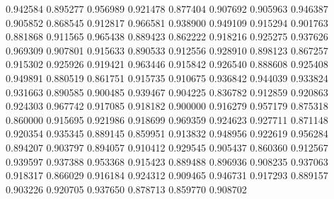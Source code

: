 0.942584
0.895277
0.956989
0.921478
0.877404
0.907692
0.905963
0.946387
0.905852
0.868545
0.912817
0.966581
0.938900
0.949109
0.915294
0.901763
0.881868
0.911565
0.965438
0.889423
0.862222
0.918216
0.925275
0.937626
0.969309
0.907801
0.915633
0.890533
0.912556
0.928910
0.898123
0.867257
0.915302
0.925926
0.919421
0.963446
0.915842
0.926540
0.888608
0.925408
0.949891
0.880519
0.861751
0.915735
0.910675
0.936842
0.944039
0.933824
0.931663
0.890585
0.900485
0.939467
0.904225
0.836782
0.912859
0.920863
0.924303
0.967742
0.917085
0.918182
0.900000
0.916279
0.957179
0.875318
0.860000
0.915695
0.921986
0.918699
0.969359
0.924623
0.927711
0.871148
0.920354
0.935345
0.889145
0.859951
0.913832
0.948956
0.922619
0.956284
0.894207
0.903797
0.894057
0.910412
0.929545
0.905437
0.860360
0.912567
0.939597
0.937388
0.953368
0.915423
0.889488
0.896936
0.908235
0.937063
0.918317
0.866029
0.916184
0.924312
0.909465
0.946731
0.917293
0.889157
0.903226
0.920705
0.937650
0.878713
0.859770
0.908702
